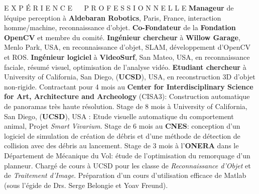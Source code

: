 




\begin{rubric}{E X P \'{E} R I E N C E ~~ P R O F E S S I O N N E L L E}
\entry*[2013--maintenant]%
  \textbf{Manageur} de l\'{e}quipe perception \`{a} \textbf{Aldebaran Robotics}, Paris, France,
interaction homme/machine, reconnaissance d'objet.
\entry*[2012--maintenant]%
  \textbf{Co-Fondateur} de la \textbf{Fondation OpenCV} et membre du comit\'{e}.
\entry*[2011--2013]%
  \textbf{Ing\'{e}nieur chercheur} \`{a} \textbf{Willow Garage}, Menlo Park,
USA,
en reconnaissance d'objet, SLAM, d\'{e}veloppement d'OpenCV et ROS.
\entry*[2009--2011]%
  \textbf{Ing\'{e}nieur logiciel} \`{a} \textbf{VideoSurf}, San Mateo, USA,
en reconnaissance faciale, r\'{e}sum\'{e} visuel, optimisation de l'analyse
vid\'{e}o.
\entry*[2004--2009]%
  \textbf{Etudiant chercheur} \`{a} University of
California, San Diego, (\textbf{UCSD}), USA, en reconstruction 3D d'objet
non-rigide.
\entry*[2007]
  Contractant pour 4 mois au \textbf{Center for Interdisciplinary Science for Art, Architecture and Archeology} (CISA3): Construction automatique de panoramas tr\`{e}s haute r\'{e}solution.
\entry*[2003]
  Stage de 8 mois \`{a} University of California, San Diego,  (\textbf{UCSD}), USA : Etude visuelle automatique du comportement animal, Projet {\em Smart Vivarium}.
\entry*[2002]
  Stage de 6 mois au \textbf{CNES}: conception d'un logiciel de simulation de cr\'{e}ation de d\'{e}bris et d'une m\'{e}thode de d\'{e}tection de collision avec des d\'{e}bris au lancement.
\entry*[2002]
  Stage de 3 mois \`{a} l'\textbf{ONERA} dans le D\'{e}partement de M\'{e}canique du
Vol: \'e{tude} de l'optimisation du remorquage d'un planneur.
\entry*[2007]
  Charg\'{e} de cours \`{a} UCSD pour les classe de \emph{Reconnaissance d'Objet} et de \emph{Traitement d'Image}.
\entry*[2006]
  Pr\'{e}paration d'un cours d'utilisation efficace de Matlab (sous l'\'{e}gide de Drs. Serge Belongie et Yoav Freund).

\end{rubric}
